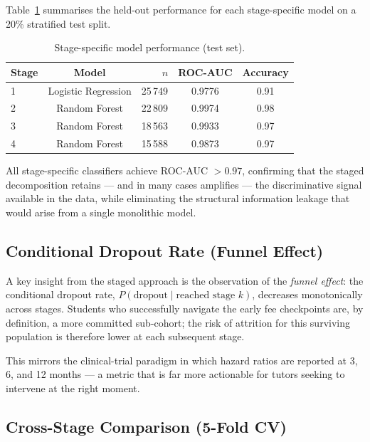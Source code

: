 \documentclass[8pt,twocolumn]{extarticle}
\begin{document}
Table~\ref{tab:stage_results} summarises the held-out performance for each
stage-specific model on a 20\% stratified test split.

\begin{table}[H]
\centering
\caption{Stage-specific model performance (test set).}
\label{tab:stage_results}
\small
\begin{tabular}{@{}lcrcc@{}}
\toprule
\textbf{Stage} & \textbf{Model} & $n$ & \textbf{ROC-AUC} & \textbf{Accuracy} \\
\midrule
1 & Logistic Regression   & 25\,749 & 0.9776 & 0.91 \\
2 & Random Forest         & 22\,809 & 0.9974 & 0.98 \\
3 & Random Forest         & 18\,563 & 0.9933 & 0.97 \\
4 & Random Forest         & 15\,588 & 0.9873 & 0.97 \\
\bottomrule
\end{tabular}
\end{table}

All stage-specific classifiers achieve ROC-AUC $> 0.97$, confirming that the staged
decomposition retains --- and in many cases amplifies --- the discriminative signal
available in the data, while eliminating the structural information leakage that would
arise from a single monolithic model.

\subsection{Conditional Dropout Rate (Funnel Effect)}

A key insight from the staged approach is the observation of the \emph{funnel effect}:
the conditional dropout rate, $P(\text{dropout} \mid \text{reached stage } k)$, decreases
monotonically across stages.  Students who successfully navigate the early fee
checkpoints are, by definition, a more committed sub-cohort; the risk of attrition
for this surviving population is therefore lower at each subsequent stage.

This mirrors the clinical-trial paradigm in which hazard ratios are reported at
3, 6, and 12 months --- a metric that is far more actionable for tutors seeking
to intervene at the right moment.

\subsection{Cross-Stage Comparison (5-Fold CV)}
\end{document}
